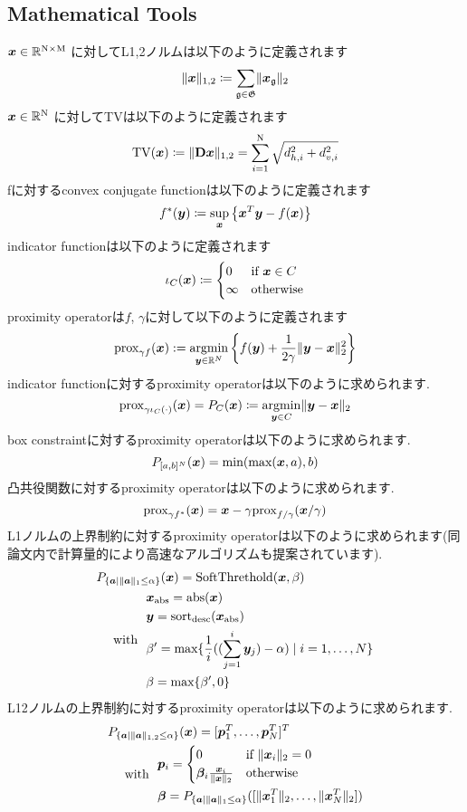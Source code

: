 \subsection{Mathematical Tools}\label{subsec:mathematical-tools}
$\vecx \in \realNumber^{\intN \times \intM}$ に対してL1,2ノルムは以下のように定義されます
\begin{equation} \label{eq:L12NormDefinitionEq} \LOneTwoNormDefinition \notag \end{equation}
$\vecx \in \realNumber^{\intN}$ に対してTV\cite{TV}は以下のように定義されます
\begin{equation} \label{eq:TVDefinitionEq} \TotalVariationDefinition \notag \end{equation}
fに対するconvex conjugate functionは以下のように定義されます
\begin{equation} \label{eq:ConjugateFunctionDefinitionEq} \conjugateFunctionDefinition \notag \end{equation}
indicator functionは以下のように定義されます
\begin{equation} \label{eq:IndicatorFunctionDefinitionEq} \indicatorFunctionDefinition \notag \end{equation}
proximity operatorは$f$, $\gamma$に対して以下のように定義されます
\begin{equation} \label{eq:ProximityOperatorDefinitionEq} \proximityOperatorDefinition \notag \end{equation}
indicator functionに対するproximity operatorは以下のように求められます.
\begin{equation} \label{eq:ProximityOperatorDefinitionWithIndicatorFunctionEq}
\proximityOperator{ \gamma \indicatorFunction{C}{\cdot} }{\vecx} = P_C(\vecx) \coloneq \argmin{\vecy \in C} \LTwoNorm{\vecy - \vecx}
\notag
\end{equation}
box constraintに対するproximity operatorは以下のように求められます.
\begin{equation} \label{eq:ProximityOperatorForBoxConstraint} \proximityOperatorForBoxConstraint \notag \end{equation}
凸共役関数に対するproximity operatorは以下のように求められます.
\begin{equation} \label{eq:ProximityOperatorDefinitionWithConvexConjugateFunctionEq} \proximityOperatorDefinitionWithConvexConjugateFunction \notag \end{equation}
L1ノルムの上界制約に対するproximity operatorは以下のように求められます\cite{L1-ball-projection}(同論文内で計算量的により高速なアルゴリズムも提案されています).
\begin{equation} \label{eq:ProximityOperatorForL1Ball} \projLOneBall \notag \end{equation}
L12ノルムの上界制約に対するproximity operatorは以下のように求められます\cite{L12-ball-projection}.
\begin{equation} \label{eq:ProximityOperatorForL12Ball} \projLOneTwoBall \notag \end{equation}


